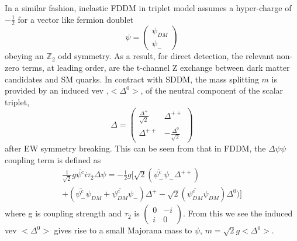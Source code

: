 \documentclass[12pt]{article}
\begin{document}
In a similar fashion, inelastic FDDM in triplet model assumes a hyper-charge of $-\frac{1}{2}$ for a vector like fermion doublet
$$
\psi = 
\begin{pmatrix}
\psi_{DM}\\
\psi_-
\end{pmatrix}
$$
obeying an $\mathbb{Z}_2$ odd symmetry.  As a result, for direct detection, the relevant non-zero terms, at leading order, are the t-channel Z exchange between dark matter candidates and SM quarks. In contract with SDDM, the mass splitting $m$ is provided by an induced vev ,$< \Delta^0 >$, of the neutral component of the scalar triplet, 
$$
\Delta = 
\begin{pmatrix}
\frac{\Delta^+}{\sqrt 2}& \Delta^{++}\\
\Delta^{++} & - \frac{\Delta^0}{\sqrt 2}
\end{pmatrix}
$$
 after EW symmetry breaking. This can be seen from that in FDDM, the $\Delta \psi \psi$ coupling term is defined as
\begin{multline*}
\frac{1}{\sqrt 2} g \overline{ \psi ^c} i \tau_2 \Delta \psi = - \frac{1}{2} g [\sqrt 2(\overline {\psi^c_- } \psi_- \Delta^{++}) \\
 + (\overline{ \psi^c_-}  \psi_{DM}+ \overline {\psi_{DM}^c } \psi_- )\Delta^{+} - \sqrt 2 ( \overline{ \psi_{DM}^c} \psi_{DM} ) \Delta^{0})] 
\end{multline*}
where g is coupling strength and $\tau_2$ is $\begin{pmatrix}0 & -i \\i & 0\end{pmatrix}$. From this we see the induced vev $< \Delta^0>$ gives rise to a small Majorana mass to $\psi$, $m = \sqrt 2 g < \Delta^0 >$. 
\end{document}
